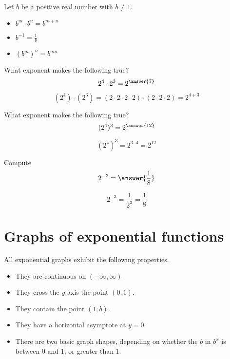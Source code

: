 \documentclass{ximera}
\begin{document}
Let $b$ be a positive real number with $b\ne 1$.
\begin{itemize}
  \item $b^m\cdot b^n = b^{m+n}$
  \item $b^{-1} = \frac{1}{b}$
  \item $\left(b^m\right)^n = b^{mn}$
\end{itemize}
\begin{question}
  What exponent makes the following true?
  \[
  2^4 \cdot 2^3 = 2^{\answer{7}}
  \]
  \begin{hint}
    \[
    (2^4) \cdot (2^3) = (2 \cdot 2\cdot 2 \cdot 2) \cdot  (2 \cdot 2\cdot 2)=2^{4+3}
    \]
  \end{hint}
\end{question}

\begin{question}
  What exponent makes the following true?
  \[
  (2^4)^3 = 2^{\answer{12}}
  \]
  \begin{hint}
    \[
    (2^4)^3 = 2^{3\cdot 4}=2^{12}
    \]
  \end{hint}
\end{question}

\begin{question}
  Compute
  \[
  2^{-3} = \answer{\frac{1}{8}}
  \]
  \begin{hint}
    \[
    2^{-3}=\frac{1}{2^3}=\frac{1}{8}
    \]
  \end{hint}
\end{question}





\section{Graphs of exponential functions}

All exponential graphs exhibit the following properties.

\begin{itemize}
\item They are continuous on $(-\infty,\infty)$.
\item They cross the $y$-axis the point $(0,1)$.
\item They contain the point $(1,b)$.
\item They have a horizontal asymptote at $y=0$.
\item There are two basic graph shapes, depending on whether the $b$ in $b^x$ is between 0 and 1, or greater than 1.
\end{itemize}
\end{document}
